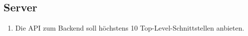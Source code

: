 \subsection{Server}

\begin{enumerate}
    \item Die API zum Backend soll höchstens 10 Top-Level-Schnittstellen anbieten.
\end{enumerate}